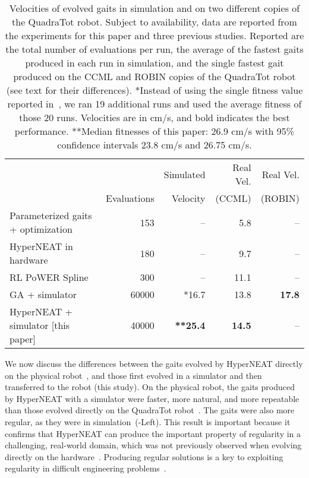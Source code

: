 \begin{table}
\begin{center}
\begin{tabular}{|l|r|r|r|r|}
\hline
                                         &              & Simulated  & Real Vel. & Real Vel.  \\
                                         & Evaluations  & Velocity &    (CCML)     & (ROBIN) \\
\hline
Parameterized gaits + optimization \cite{yos:clune}   &153    & --    & 5.8 & --\\
\hline
HyperNEAT in hardware \cite{yos:clune}                 & 180         & --         &   9.7  & --   \\
\hline
RL PoWER Spline \cite{haocheng}                         & 300         & --         &   11.1 & --\\
\hline
GA + simulator \cite{glette}             & 60000       & *16.7       &   13.8   & \textbf{17.8}  \\
\hline
HyperNEAT + simulator [this paper]                     & 40000       & \textbf{**25.4}       &   \textbf{14.5} & --\\
\hline
\end{tabular}
\vspace{.35cm}
\caption{Velocities of evolved gaits in simulation and on two different copies of the QuadraTot robot. Subject to availability, data are reported from the experiments for this paper and three previous studies. Reported are the total number of evaluations per run, the average of the fastest gaits produced in each run in simulation, and the single fastest gait produced on the CCML and ROBIN copies of the QuadraTot robot (see text for their differences). *Instead of using the single fitness value reported in~\cite{glette}, we ran 19 additional runs and used the average fitness of those 20 runs. Velocities are in cm/s, and bold indicates the best performance. **Median fitnesses of this paper: 26.9 cm/s with 95\% confidence intervals 23.8 cm/s and 26.75 cm/s.}  
\end{center}
\end{table}

We now discuss the differences between the gaits evolved by HyperNEAT directly on the physical robot~\cite{yos:clune}, and those first evolved in a simulator and then transferred to the robot (this study). 
On the physical robot, the gaits produced by HyperNEAT with a simulator were faster, more natural, and more repeatable than those evolved directly on the QuadraTot robot~\cite{yos:clune}. The gaits were also more regular, as they were in simulation~(-Left). This result is important because it confirms that HyperNEAT can produce the important property of
regularity in a challenging, real-world domain, which was not previously observed when
evolving directly on the hardware~\cite{yos:clune}. Producing regular solutions is a key to exploiting regularity in difficult engineering problems~\cite{clune2011performance}. 


